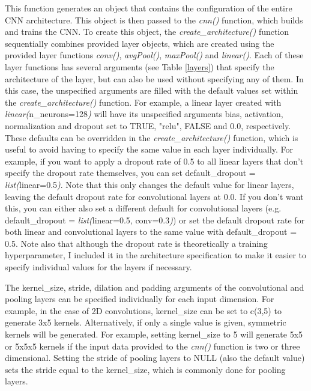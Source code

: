 \documentclass[12pt,twoside]{scrreport}
\newcommand{\fn}[2][]{\textit{#2(}#1\textit{)}}
\begin{document}
This function generates an object that contains the configuration of the entire CNN architecture. This object is then passed to the \fn{cnn} function, which builds and trains the CNN. To create this object, the \fn{create\_architecture} function sequentially combines provided layer objects, which are created using the provided layer functions \fn{conv}, \fn{avgPool}, \fn{maxPool} and \fn{linear}. Each of these layer functions has several arguments (see Table \ref{layers}) that specify the architecture of the layer, but can also be used without specifying any of them. In this case, the unspecified arguments are filled with the default values set within the \fn{create\_architecture} function. For example, a linear layer created with \fn[n\_neurons=128]{linear} will have its unspecified arguments bias, activation, normalization and dropout set to TRUE, "relu", FALSE and 0.0, respectively. These defaults can be overridden in the \fn{create\_architecture} function, which is useful to avoid having to specify the same value in each layer individually. For example, if you want to apply a dropout rate of 0.5 to all linear layers that don't specify the dropout rate themselves, you can set default\_dropout = \fn[linear=0.5]{list}. Note that this only changes the default value for linear layers, leaving the default dropout rate for convolutional layers at 0.0. If you don't want this, you can either also set a different default for convolutional layers (e.g. default\_dropout = \fn[linear=0.5, conv=0.3]{list}) or set the default dropout rate for both linear and convolutional layers to the same value with default\_dropout = 0.5. Note also that although the dropout rate is theoretically a training hyperparameter, I included it in the architecture specification to make it easier to specify individual values for the layers if necessary.

The kernel\_size, stride, dilation and padding arguments of the convolutional and pooling layers can be specified individually for each input dimension. For example, in the case of 2D convolutions, kernel\_size can be set to c(3,5) to generate 3x5 kernels. Alternatively, if only a single value is given, symmetric kernels will be generated. For example, setting kernel\_size to 5 will generate 5x5 or 5x5x5 kernels if the input data provided to the \fn{cnn} function is two or three dimensional. Setting the stride of pooling layers to NULL (also the default value) sets the stride equal to the kernel\_size, which is commonly done for pooling layers.
\end{document}
